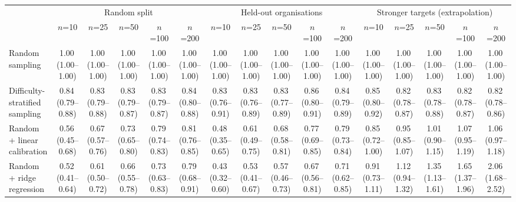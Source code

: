 \begin{tabular}{lccccccccccccccc}
\toprule
 & \multicolumn{5}{c}{Random split} & \multicolumn{5}{c}{Held-out organisations} & \multicolumn{5}{c}{Stronger targets (extrapolation)} \\
 & $n$=10 & $n$=25 & $n$=50 & $n$=100 & $n$=200 & $n$=10 & $n$=25 & $n$=50 & $n$=100 & $n$=200 & $n$=10 & $n$=25 & $n$=50 & $n$=100 & $n$=200 \\
\midrule
Random sampling & 1.00\,\scriptsize(1.00--1.00) & 1.00\,\scriptsize(1.00--1.00) & 1.00\,\scriptsize(1.00--1.00) & 1.00\,\scriptsize(1.00--1.00) & 1.00\,\scriptsize(1.00--1.00) & 1.00\,\scriptsize(1.00--1.00) & 1.00\,\scriptsize(1.00--1.00) & 1.00\,\scriptsize(1.00--1.00) & 1.00\,\scriptsize(1.00--1.00) & 1.00\,\scriptsize(1.00--1.00) & 1.00\,\scriptsize(1.00--1.00) & 1.00\,\scriptsize(1.00--1.00) & 1.00\,\scriptsize(1.00--1.00) & 1.00\,\scriptsize(1.00--1.00) & 1.00\,\scriptsize(1.00--1.00) \\
Difficulty-stratified sampling & 0.84\,\scriptsize(0.79--0.88) & 0.83\,\scriptsize(0.79--0.88) & 0.83\,\scriptsize(0.79--0.87) & 0.83\,\scriptsize(0.79--0.87) & 0.84\,\scriptsize(0.80--0.88) & 0.83\,\scriptsize(0.76--0.91) & 0.83\,\scriptsize(0.76--0.89) & 0.83\,\scriptsize(0.77--0.89) & 0.86\,\scriptsize(0.80--0.91) & 0.84\,\scriptsize(0.79--0.89) & 0.85\,\scriptsize(0.80--0.92) & 0.82\,\scriptsize(0.78--0.87) & 0.83\,\scriptsize(0.78--0.88) & 0.82\,\scriptsize(0.78--0.87) & 0.82\,\scriptsize(0.78--0.86) \\
Random + linear calibration & 0.56\,\scriptsize(0.45--0.68) & 0.67\,\scriptsize(0.57--0.76) & 0.73\,\scriptsize(0.65--0.80) & 0.79\,\scriptsize(0.74--0.83) & 0.81\,\scriptsize(0.76--0.85) & 0.48\,\scriptsize(0.35--0.65) & 0.61\,\scriptsize(0.49--0.75) & 0.68\,\scriptsize(0.58--0.81) & 0.77\,\scriptsize(0.69--0.85) & 0.79\,\scriptsize(0.73--0.84) & 0.85\,\scriptsize(0.72--1.00) & 0.95\,\scriptsize(0.85--1.07) & 1.01\,\scriptsize(0.90--1.15) & 1.07\,\scriptsize(0.95--1.19) & 1.06\,\scriptsize(0.97--1.18) \\
Random + ridge regression & 0.52\,\scriptsize(0.41--0.64) & 0.61\,\scriptsize(0.50--0.72) & 0.66\,\scriptsize(0.55--0.78) & 0.73\,\scriptsize(0.63--0.83) & 0.79\,\scriptsize(0.68--0.91) & 0.43\,\scriptsize(0.32--0.60) & 0.53\,\scriptsize(0.41--0.67) & 0.57\,\scriptsize(0.46--0.73) & 0.67\,\scriptsize(0.56--0.81) & 0.71\,\scriptsize(0.62--0.85) & 0.91\,\scriptsize(0.73--1.11) & 1.12\,\scriptsize(0.94--1.32) & 1.35\,\scriptsize(1.13--1.61) & 1.65\,\scriptsize(1.37--1.96) & 2.06\,\scriptsize(1.68--2.52) \\

\end{tabular}
